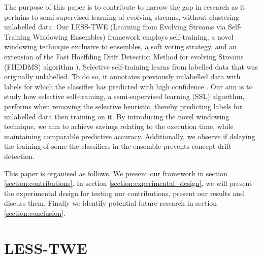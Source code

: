 \documentclass[runningheads]{llncs}
\begin{document}
The purpose of this paper is to contribute to narrow the gap in research as it pertains to semi-supervised learning of evolving streams, without clustering unlabelled data.
Our LESS-TWE (Learning from Evolving Streams via Self-Training Windowing Ensembles) framework employs self-training, a novel windowing technique exclusive to ensembles, a soft voting strategy, and an extension of the Fast Hoeffding Drift Detection Method for evolving Streams (FHDDMS) algorithm \cite{pesaranghader2018reservoir}).
Selective self-training learns from labelled data that was originally unlabelled. To do so, it annotates previously unlabelled data with labels for which the classifier has predicted with high confidence \cite{zhu2009selftraining}. Our aim is to study how selective self-training, a semi-supervised learning (SSL) algorithm, performs when removing the selective heuristic, thereby predicting labels for unlabelled data then training on it.  
By introducing the novel windowing technique, we aim to achieve savings relating to the execution time, while maintaining comparable predictive accuracy. Additionally, we observe if delaying the training of some the classifiers in the ensemble prevents concept drift detection.




This paper is organised as follows.  We present our framework in section \ref{section:contributions}.  In section \ref{section:experimental_design}, we will present the experimental design for testing our contributions, present our results and discuss them. Finally we identify potential future research in section \ref{section:conclusion}.

\section{LESS-TWE\label{section:contributions}}
\end{document}

